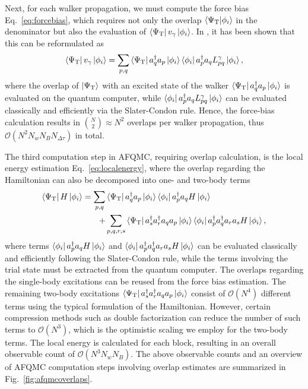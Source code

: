 \documentclass[../main.tex]{subfiles}
\begin{document}
Next, for each walker propagation, we must compute the force bias Eq.~\ref{eq:forcebias}, which requires not only the overlap $\braket{\Psi_\mathrm{T}}{\phi_i}$ in the denominator but also the evaluation of $\bra{\Psi_\mathrm{T}} v_\gamma \ket{\phi_i}$. In \cite{huggins2022unbiasing}, it has been shown that this can be reformulated as
\begin{equation}
    \bra{\Psi_\mathrm{T}} v_\gamma \ket{\phi_i} = \sum_{p,q} \bra{\Psi_\mathrm{T}} a_q^\dagger a_p \ket{\phi_i} \bra{\phi_i} a_p^\dagger a_q  L_{pq}^\gamma \ket{\phi_i},
\end{equation} where the overlap of $\ket{\Psi_\mathrm{T}}$ with an excited state of the walker $ \bra{\Psi_\mathrm{T}} a_q^\dagger a_p \ket{\phi_i}$ is evaluated on the quantum computer, while $\bra{\phi_i} a_p^\dagger a_q  L_{pq}^\gamma \ket{\phi_i}$ can be evaluated classically and efficiently via the Slater-Condon rule. Hence, the force-bias calculation results in  $\binom{N}{2} \approx N^2$ overlaps per walker propagation, thus $\mathcal{O} (N^2 N_w N_B N_{\Delta\tau})$ in total.

The third computation step in AFQMC, requiring overlap calculation, is the local energy estimation  Eq.~\ref{eq:localenergy}, where the overlap regarding the Hamiltonian can also be decomposed into one- and two-body terms
\begin{align}
    \bra{\Psi_\mathrm{T}} H \ket{\phi_i} = \sum_{p,q} &\bra{\Psi_\mathrm{T}}  a_q^\dagger a_p \ket{\phi_i} \bra{\phi_i} a_p^\dagger a_q H \ket{\phi_i} \\ +& \sum_{p,q,r,s}  \bra{\Psi_\mathrm{T}} a_s^\dagger a_r^\dagger a_q a_p \ket{\phi_i} \bra{\phi_i} a_p^\dagger a_q^\dagger a_r a_s H \ket{\phi_i},
\end{align} where terms $\bra{\phi_i} a_p^\dagger a_q H \ket{\phi_i}$ and $\bra{\phi_i} a_p^\dagger a_q^\dagger a_r a_s H \ket{\phi_i}$ can be evaluated classically and efficiently following the Slater-Condon rule, while the terms involving the trial state must be extracted from the quantum computer. The overlaps regarding the single-body excitations can be reused from the force bias estimation. The remaining two-body excitations $\bra{\Psi_\mathrm{T}} a_s^\dagger a_r^\dagger a_q a_p \ket{\phi_i}$ consist of $\mathcal{O}(N^4)$ different terms using the typical formulation of the Hamiltonian. However, certain compression methods such as double factorization \cite{lee2020even} can reduce the number of such terms to $\mathcal{O}(N^3)$, which is the optimistic scaling we employ for the two-body terms. The local energy is calculated for each block, resulting in an overall observable count of  $\mathcal{O}(N^3 N_w N_B)$. The above observable counts and an overview of AFQMC computation steps involving overlap estimates are summarized in Fig.~\ref{fig:afqmcoverlaps}. 
\end{document}
